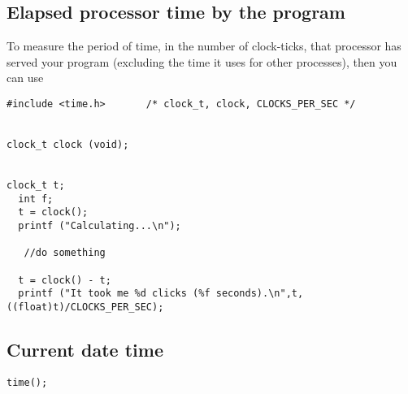 \subsection{Elapsed processor time by the program}

To measure the period of time, in the number of clock-ticks, that processor
has served your program (excluding the time it uses for other processes), then
you can use
\begin{verbatim}
#include <time.h>       /* clock_t, clock, CLOCKS_PER_SEC */


clock_t clock (void);


clock_t t;
  int f;
  t = clock();
  printf ("Calculating...\n");

   //do something
   
  t = clock() - t;
  printf ("It took me %d clicks (%f seconds).\n",t,((float)t)/CLOCKS_PER_SEC);
\end{verbatim}


\subsection{Current date time}

\begin{verbatim}
time();
\end{verbatim}